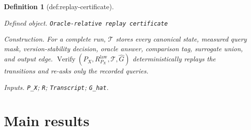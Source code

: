 \documentclass{article}
\newtheorem{definition}{Definition}
\begin{document}
\begin{definition}[def:replay-certificate]\label{def:replay-certificate}
\par\smallskip\noindent\emph{Defined object.} \texttt{Oracle-\allowbreak{}relative replay certificate}
\par\smallskip\noindent\emph{Construction.} For a complete run, \(\mathcal T\) stores every canonical state, measured query mask, version-stability decision, oracle answer, comparison tag, surrogate union, and output edge. \(\operatorname{Verify}(P_X,R^{\mathrm{law}}_{P_X},\mathcal T,\widehat G)\) deterministically replays the transitions and re-asks only the recorded queries.
\par\smallskip\noindent\emph{Inputs.} \texttt{P\_\allowbreak{}X}; \texttt{R}; \texttt{Transcript}; \texttt{G\_\allowbreak{}hat}.
\end{definition}

\section{Main results}
\end{document}
